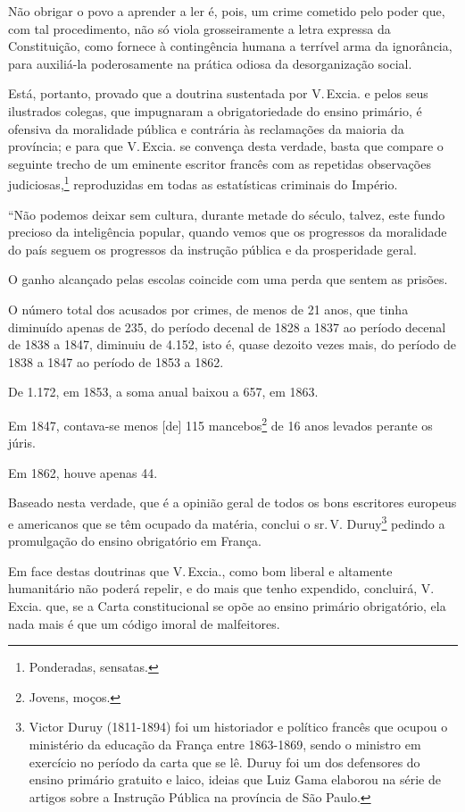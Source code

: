 Não obrigar o povo a aprender a ler é, pois, um crime cometido pelo
poder que, com tal procedimento, não só viola grosseiramente a letra
expressa da Constituição, como fornece à contingência humana a terrível
arma da ignorância, para auxiliá-la poderosamente na prática odiosa da
desorganização social.

Está, portanto, provado que a doutrina sustentada por V.\,Excia. e pelos
seus ilustrados colegas, que impugnaram a obrigatoriedade do ensino
primário, é ofensiva da moralidade pública e contrária às reclamações da
maioria da província; e para que V.\,Excia. se convença desta verdade,
basta que compare o seguinte trecho de um eminente escritor francês com
as repetidas observações judiciosas,\footnote{Ponderadas, sensatas.}
reproduzidas em todas as estatísticas criminais do Império.

``Não podemos deixar sem cultura, durante metade do século, talvez, este
fundo precioso da inteligência popular, quando vemos que os progressos
da moralidade do país seguem os progressos da instrução pública e da
prosperidade geral.

O ganho alcançado pelas escolas coincide com uma perda que sentem as
prisões.

O número total dos acusados por crimes, de menos de 21 anos, que tinha
diminuído apenas de 235, do período decenal de 1828 a 1837 ao período
decenal de 1838 a 1847, diminuiu de 4.152, isto é, quase dezoito vezes
mais, do período de 1838 a 1847 ao período de 1853 a 1862.

De 1.172, em 1853, a soma anual baixou a 657, em 1863.

Em 1847, contava-se menos {[}de{]} 115 mancebos\footnote{Jovens,
  moços.} de 16 anos levados perante os júris.

Em 1862, houve apenas 44.

Baseado nesta verdade, que é a opinião geral de todos os bons escritores
europeus e americanos que se têm ocupado da matéria, conclui o sr.\,V.
Duruy\footnote{Victor Duruy (1811-1894) foi um historiador e político
  francês que ocupou o ministério da educação da França entre 1863-1869,
  sendo o ministro em exercício no período da carta que se lê. Duruy foi
  um dos defensores do ensino primário gratuito e laico, ideias que Luiz
  Gama elaborou na série de artigos sobre a Instrução Pública na
  província de São Paulo.\label{duruy}} pedindo a promulgação do ensino obrigatório
em França.

Em face destas doutrinas que V.\,Excia., como bom liberal e altamente
humanitário não poderá repelir, e do mais que tenho expendido,
concluirá, V.\,Excia. que, se a Carta constitucional se opõe ao ensino
primário obrigatório, ela nada mais é que um código imoral de
malfeitores.

